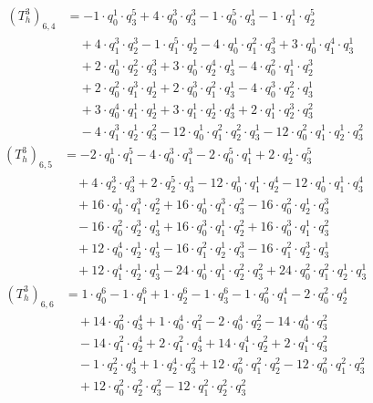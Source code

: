 \begin{align*}(T_{h}^3)_{6,4}&=-1\cdot q_0^{1}\cdot q_3^{5}+4\cdot q_0^{3}\cdot q_3^{3}-1\cdot q_0^{5}\cdot q_3^{1}-1\cdot q_1^{1}\cdot q_2^{5}\\
&\quad +4\cdot q_1^{3}\cdot q_2^{3}-1\cdot q_1^{5}\cdot q_2^{1}-4\cdot q_0^{1}\cdot q_1^{2}\cdot q_3^{3}+3\cdot q_0^{1}\cdot q_1^{4}\cdot q_3^{1}\\
&\quad +2\cdot q_0^{1}\cdot q_2^{2}\cdot q_3^{3}+3\cdot q_0^{1}\cdot q_2^{4}\cdot q_3^{1}-4\cdot q_0^{2}\cdot q_1^{1}\cdot q_2^{3}\\
&\quad +2\cdot q_0^{2}\cdot q_1^{3}\cdot q_2^{1}+2\cdot q_0^{3}\cdot q_1^{2}\cdot q_3^{1}-4\cdot q_0^{3}\cdot q_2^{2}\cdot q_3^{1}\\
&\quad +3\cdot q_0^{4}\cdot q_1^{1}\cdot q_2^{1}+3\cdot q_1^{1}\cdot q_2^{1}\cdot q_3^{4}+2\cdot q_1^{1}\cdot q_2^{3}\cdot q_3^{2}\\
&\quad -4\cdot q_1^{3}\cdot q_2^{1}\cdot q_3^{2}-12\cdot q_0^{1}\cdot q_1^{2}\cdot q_2^{2}\cdot q_3^{1}-12\cdot q_0^{2}\cdot q_1^{1}\cdot q_2^{1}\cdot q_3^{2}\end{align*}
\begin{align*}(T_{h}^3)_{6,5}&=-2\cdot q_0^{1}\cdot q_1^{5}-4\cdot q_0^{3}\cdot q_1^{3}-2\cdot q_0^{5}\cdot q_1^{1}+2\cdot q_2^{1}\cdot q_3^{5}\\
&\quad +4\cdot q_2^{3}\cdot q_3^{3}+2\cdot q_2^{5}\cdot q_3^{1}-12\cdot q_0^{1}\cdot q_1^{1}\cdot q_2^{4}-12\cdot q_0^{1}\cdot q_1^{1}\cdot q_3^{4}\\
&\quad +16\cdot q_0^{1}\cdot q_1^{3}\cdot q_2^{2}+16\cdot q_0^{1}\cdot q_1^{3}\cdot q_3^{2}-16\cdot q_0^{2}\cdot q_2^{1}\cdot q_3^{3}\\
&\quad -16\cdot q_0^{2}\cdot q_2^{3}\cdot q_3^{1}+16\cdot q_0^{3}\cdot q_1^{1}\cdot q_2^{2}+16\cdot q_0^{3}\cdot q_1^{1}\cdot q_3^{2}\\
&\quad +12\cdot q_0^{4}\cdot q_2^{1}\cdot q_3^{1}-16\cdot q_1^{2}\cdot q_2^{1}\cdot q_3^{3}-16\cdot q_1^{2}\cdot q_2^{3}\cdot q_3^{1}\\
&\quad +12\cdot q_1^{4}\cdot q_2^{1}\cdot q_3^{1}-24\cdot q_0^{1}\cdot q_1^{1}\cdot q_2^{2}\cdot q_3^{2}+24\cdot q_0^{2}\cdot q_1^{2}\cdot q_2^{1}\cdot q_3^{1}\end{align*}
\begin{align*}(T_{h}^3)_{6,6}&=1\cdot q_0^{6}-1\cdot q_1^{6}+1\cdot q_2^{6}-1\cdot q_3^{6}-1\cdot q_0^{2}\cdot q_1^{4}-2\cdot q_0^{2}\cdot q_2^{4}\\
&\quad +14\cdot q_0^{2}\cdot q_3^{4}+1\cdot q_0^{4}\cdot q_1^{2}-2\cdot q_0^{4}\cdot q_2^{2}-14\cdot q_0^{4}\cdot q_3^{2}\\
&\quad -14\cdot q_1^{2}\cdot q_2^{4}+2\cdot q_1^{2}\cdot q_3^{4}+14\cdot q_1^{4}\cdot q_2^{2}+2\cdot q_1^{4}\cdot q_3^{2}\\
&\quad -1\cdot q_2^{2}\cdot q_3^{4}+1\cdot q_2^{4}\cdot q_3^{2}+12\cdot q_0^{2}\cdot q_1^{2}\cdot q_2^{2}-12\cdot q_0^{2}\cdot q_1^{2}\cdot q_3^{2}\\
&\quad +12\cdot q_0^{2}\cdot q_2^{2}\cdot q_3^{2}-12\cdot q_1^{2}\cdot q_2^{2}\cdot q_3^{2}\end{align*}
